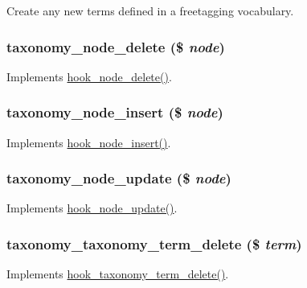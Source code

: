 Create any new terms defined in a freetagging vocabulary. \hypertarget{group__taxonomy__index_gae47bb910cad247043b7ce8fda691ef74}{
\subsubsection[{taxonomy\_\-node\_\-delete}]{\setlength{\rightskip}{0pt plus 5cm}taxonomy\_\-node\_\-delete (\$ {\em node})}}
\label{group__taxonomy__index_gae47bb910cad247043b7ce8fda691ef74}
Implements \hyperlink{group__node__api__hooks_ga66ea0473a9950dc961802e801e5042e9}{hook\_\-node\_\-delete()}. \hypertarget{group__taxonomy__index_ga48e783c30c362615a8747a02e49c8c32}{
\subsubsection[{taxonomy\_\-node\_\-insert}]{\setlength{\rightskip}{0pt plus 5cm}taxonomy\_\-node\_\-insert (\$ {\em node})}}
\label{group__taxonomy__index_ga48e783c30c362615a8747a02e49c8c32}
Implements \hyperlink{group__node__api__hooks_ga8b40dc62e46e5055c205d2a723dc3548}{hook\_\-node\_\-insert()}. \hypertarget{group__taxonomy__index_gac6d5a5135886afdfe870c657df502908}{
\subsubsection[{taxonomy\_\-node\_\-update}]{\setlength{\rightskip}{0pt plus 5cm}taxonomy\_\-node\_\-update (\$ {\em node})}}
\label{group__taxonomy__index_gac6d5a5135886afdfe870c657df502908}
Implements \hyperlink{group__node__api__hooks_gac66c767cc922fcbfdaf17252e5d87d9d}{hook\_\-node\_\-update()}. \hypertarget{group__taxonomy__index_ga560abdef7f1cccbd2eb55f6ae78ac10e}{
\subsubsection[{taxonomy\_\-taxonomy\_\-term\_\-delete}]{\setlength{\rightskip}{0pt plus 5cm}taxonomy\_\-taxonomy\_\-term\_\-delete (\$ {\em term})}}
\label{group__taxonomy__index_ga560abdef7f1cccbd2eb55f6ae78ac10e}
Implements \hyperlink{group__hooks_gab55fa1f290f3d43ea59795123154cf32}{hook\_\-taxonomy\_\-term\_\-delete()}. 